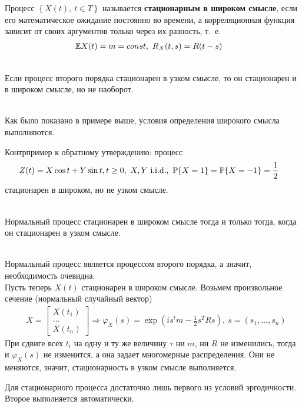 \begin{Def}
    Процесс $\left\{ X(t), \ t \in T \right\}$ называется \textbf{стационарным в
      широком смысле}, если его математическое ожидание постоянно во времени, а
    корреляционная функция зависит от своих аргументов только через их разность, т.~е.
    \begin{align*}
      & \mathbb{E} X(t) = m = const, \ R_X(t,s) = R(t-s)
    \end{align*}
\end{Def}
\begin{Prop}
    ~
    \\
    Если процесс второго порядка стационарен в узком смысле, то он стационарен и
    в широком смысле, но не наоборот.
\end{Prop}
\begin{Proof}
    ~
    \\
    Как было показано в примере выше, условия определения широкого смысла выполняются.
\end{Proof}
\begin{example}
    Контрпример к обратному утверждению: процесс
    \begin{align*}
      & Z(t) = X\cos t + Y \sin t, t \geq 0, \ X,Y \ \text{i}.\text{i}.\text{d}., \ \mathbb{P}\{X = 1\} = \mathbb{P}\{X = -1\} = \frac{1}{2}
    \end{align*}
    стационарен в широком, но не узком смысле.
\end{example}
\begin{theorem}
    ~
    \\
    Нормальный процесс стационарен в широком смысле тогда и только тогда, когда
    он стационарен в узком смысле.
\end{theorem}
\begin{Proof}
    ~
    \\
    Нормальный процесс является процессом второго порядка, а значит,
    необходимость очевидна.
    \\
    Пусть теперь $X(t)$ стационарен в широком смысле. Возьмем произвольное
    сечение (нормальный случайный вектор)
    \begin{align*}
      & X = \left[ \begin{matrix}
              X(t_1) \\
              \dots \\
              X(t_n)
          \end{matrix} \right] \Rightarrow \varphi_X(s) = \exp \left( is^tm - \frac{1}{2}s^TRs \right), \ s = \left( s_1, \dots, s_n \right)
    \end{align*}
    При сдвиге всех $t_i$ на одну и ту же величину $\tau$ ни $m$, ни $R$ не
    изменились, тогда и $\varphi_X(s)$ не изменится, а она задает многомерные
    распределения. Они не меняются, значит, стационарность в узком смысле
    выполняется.
\end{Proof}
\begin{Note}
    Для стационарного процесса достаточно лишь первого из условий эргодичности.
    Второе выполняется автоматически.
\end{Note}